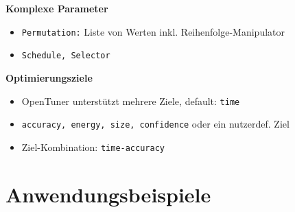   \begingroup
  \begin{frame}
    \textbf{Komplexe Parameter}
    \begin{itemize}

      
      \item \texttt{Permutation:} Liste von Werten inkl. Reihenfolge-Manipulator
      \item \texttt{Schedule, Selector} \newline
      
    \end{itemize}
  
  \textbf{Optimierungsziele}
    \begin{itemize}
      \item OpenTuner unterstützt mehrere Ziele, default: \texttt{time}
      \item \texttt{accuracy, energy, size, confidence} oder ein nutzerdef. Ziel
      \item Ziel-Kombination: \texttt{time-accuracy}
    \end{itemize}
  \end{frame}
  \endgroup
    
    \section{Anwendungsbeispiele}
    
    \begin{frame}
      \tableofcontents[currentsection]
    \end{frame}
    
    
